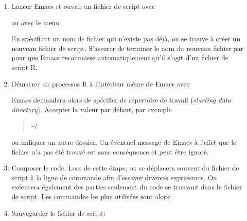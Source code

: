 \begin{enumerate}
\item Lancer Emacs et ouvrir un fichier de script avec
  \begin{quote}
  \end{quote}
  ou avec le menu
  \begin{quote}
  \end{quote}
  En spécifiant un nom de fichier qui n'existe pas déjà, on se trouve
  à créer un nouveau fichier de script. S'assurer de terminer le nom
  du nouveau fichier par  pour que Emacs reconnaisse
  automatiquement qu'il s'agit d'un fichier de script R.
\item Démarrer un processus R à l'intérieur même de Emacs avec
  \begin{quote}
    \returnkey
  \end{quote}
  Emacs demandera alors de spécifier de répertoire de travail
  (\emph{starting data directory}). Accepter la valeur par défaut, par
  exemple
  \begin{quote}
    \verb=~/ =\returnkey
  \end{quote}
  ou indiquer un autre dossier. Un éventuel message de Emacs à l'effet
  que le fichier  n'a pas été trouvé est sans
  conséquence et peut être ignoré.
\item Composer le code. Lors de cette étape, on se déplacera souvent
  du fichier de script à la ligne de commande afin d'essayer diverses
  expressions. On exécutera également des parties seulement du code se
  trouvant dans le fichier de script. Les commandes les plus utilisées
  sont alors:
  \begin{quote}
  \end{quote}
\item Sauvegarder le fichier de script:
  \begin{quote}
  \end{quote}

\end{enumerate}
